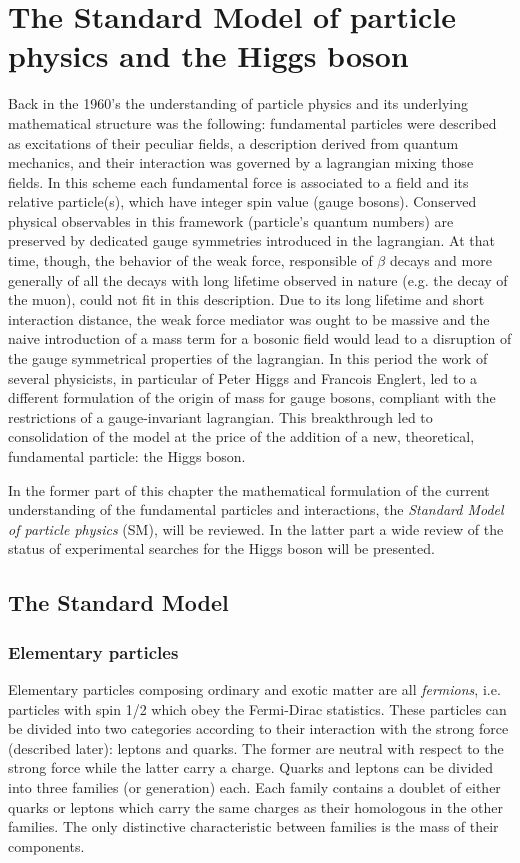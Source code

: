\chapter[The Higgs boson]{The Standard Model of particle physics and the Higgs boson}

Back in the 1960's the understanding of particle physics and its underlying mathematical structure was the following: fundamental particles were described as excitations of their peculiar fields, a description derived from quantum mechanics, and their interaction was governed by a lagrangian mixing those fields. In this scheme each fundamental force is associated to a field and its relative particle(s), which have integer spin value (gauge bosons). Conserved physical observables in this framework (particle's quantum numbers) are preserved by dedicated gauge symmetries introduced in the lagrangian. At that time, though, the behavior of the weak force, responsible of $\beta$ decays and more generally of all the decays with long lifetime observed in nature (e.g. the decay of the muon), could not fit in this description. Due to its long lifetime and short interaction distance, the weak force mediator was ought to be massive and the naive introduction of a mass term for a bosonic field would lead to a disruption of the gauge symmetrical properties of the lagrangian. In this period the work of several physicists, in particular of Peter Higgs and Francois Englert, led to a different formulation of the origin of mass for gauge bosons, compliant with the restrictions of a gauge-invariant lagrangian. This breakthrough led to consolidation of the model at the price of the addition of a new, theoretical, fundamental particle: the Higgs boson.

In the former part of this chapter the mathematical formulation of the current understanding of the fundamental particles and interactions, the \emph{Standard Model of particle physics} (SM), will be reviewed. In the latter part a wide review of the status of experimental searches for the Higgs boson will be presented.

\section{The Standard Model}
\subsection{Elementary particles}

Elementary particles composing ordinary and exotic matter are all \emph{fermions}, i.e. particles with spin 1/2 which obey the Fermi-Dirac statistics. These particles can be divided into two categories according to their interaction with the strong force (described later): leptons and quarks. The former are neutral with respect to the strong force while the latter carry a charge. Quarks and leptons can be divided into three families (or generation) each. Each family contains a doublet of either quarks or leptons which carry the same charges as their homologous in the other families. The only distinctive characteristic between families is the mass of their components.


